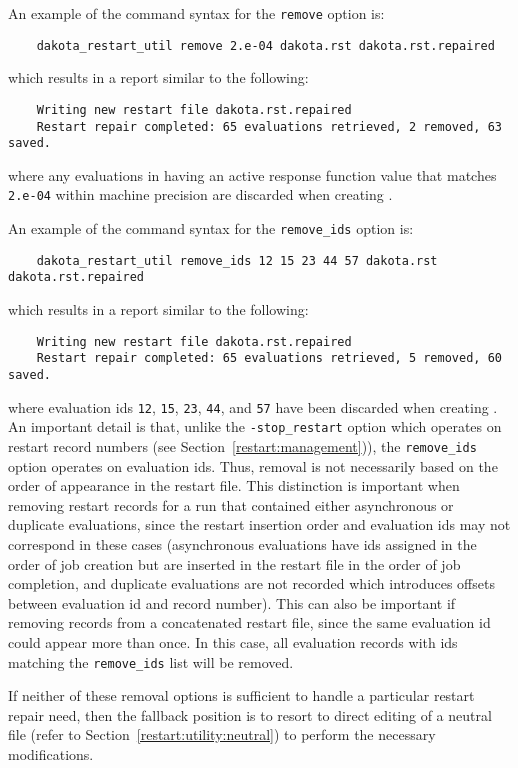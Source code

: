 An example of the command syntax for the \texttt{remove} option is:
\begin{small}
\begin{verbatim}
    dakota_restart_util remove 2.e-04 dakota.rst dakota.rst.repaired
\end{verbatim}
\end{small}
which results in a report similar to the following:
\begin{small}
\begin{verbatim}
    Writing new restart file dakota.rst.repaired
    Restart repair completed: 65 evaluations retrieved, 2 removed, 63 saved.
\end{verbatim}
\end{small}
where any evaluations in  having an active response
function value that matches \texttt{2.e-04} within machine precision
are discarded when creating .

An example of the command syntax for the \texttt{remove\_ids} option is:
\begin{small}
\begin{verbatim}
    dakota_restart_util remove_ids 12 15 23 44 57 dakota.rst dakota.rst.repaired
\end{verbatim}
\end{small}
which results in a report similar to the following:
\begin{small}
\begin{verbatim}
    Writing new restart file dakota.rst.repaired
    Restart repair completed: 65 evaluations retrieved, 5 removed, 60 saved.
\end{verbatim}
\end{small}
where evaluation ids \texttt{12}, \texttt{15}, \texttt{23},
\texttt{44}, and \texttt{57} have been discarded when creating
. An important detail is that, unlike the
\texttt{-stop\_restart} option which operates on restart record numbers 
(see Section~\ref{restart:management})), the \texttt{remove\_ids}
option operates on evaluation ids.  Thus, removal is not necessarily
based on the order of appearance in the restart file. This distinction
is important when removing restart records for a run that contained
either asynchronous or duplicate evaluations, since the restart
insertion order and evaluation ids may not correspond in these cases
(asynchronous evaluations have ids assigned in the order of job
creation but are inserted in the restart file in the order of job
completion, and duplicate evaluations are not recorded which
introduces offsets between evaluation id and record number). This can
also be important if removing records from a concatenated restart
file, since the same evaluation id could appear more than once. In
this case, all evaluation records with ids matching the
\texttt{remove\_ids} list will be removed.

If neither of these removal options is sufficient to handle a
particular restart repair need, then the fallback position is to
resort to direct editing of a neutral file (refer to
Section~\ref{restart:utility:neutral}) to perform the necessary
modifications.
